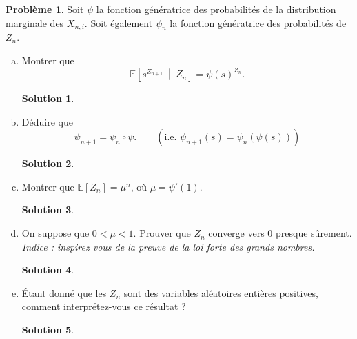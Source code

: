 \documentclass[11pt]{amsart}
\theoremstyle{definition}
\newtheorem{probleme}{Problème}
\newtheorem*{solution}{Solution}
\theoremstyle{remark}
\numberwithin{equation}{section}
\newcommand{\ES} {\mathbb E}
\newcommand{\ct}[1]{\left[ #1 \right]} %
\newcommand{\cond}{\ \middle\vert \ }
\newcommand \1 {\mathbbm 1}
\begin{document}
	\begin{probleme}
		Soit $\psi$ la fonction génératrice des probabilités de la distribution 
		marginale des $X_{n, i}$. Soit également $\psi_n$ la fonction génératrice 
		des probabilités de $Z_n$.
	
		\begin{enumerate}[(a)]
			\item Montrer que
			$$\ES \ct{s^{Z_{n+1}} \cond Z_n} = \psi (s)^{Z_n}.$$
		
		\begin{solution}
		\end{solution}
		\vspace{0.3cm}
		
			
			\item Déduire que
			$$\psi_{n+1} = \psi_n \circ \psi. \qquad (\text{i.e. } \psi_{n+1} (s) = \psi_n ( \psi (s)) )$$
		
		\begin{solution}
		\end{solution}
		\vspace{0.3cm}
			
			\item Montrer que $\ES \ct{Z_n} = \mu^n$, où $\mu = \psi'(1)$.
		
		\begin{solution}
		\end{solution}
		\vspace{0.3cm}
			
			
			\item On suppose que $0 < \mu < 1$.
			 Prouver que $Z_n$ converge vers $0$ presque sûrement.
			 \em Indice : \em inspirez vous de la preuve de la loi forte des grands nombres.
		
		\begin{solution}
		\end{solution}
		\vspace{0.3cm}
			 
			 
			 \item Étant donné que les $Z_n$ sont des variables aléatoires entières positives,
			 comment interprétez-vous ce résultat ?
		
		\begin{solution}
		\end{solution}
		\vspace{0.3cm}
		
	\end{enumerate}
	\end{probleme}
		
\end{document}

